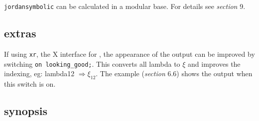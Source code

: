 {\tt jordansymbolic} can be calculated in a modular base. For details 
see {\it section} 9.

\subsection{extras}

If using {\tt xr}, the X interface for \REDUCE, the appearance of the 
output can be improved by switching {\tt on looking\_good;}. This 
converts all lambda to $\xi$ and improves the indexing, eg: lambda12 
$\Rightarrow \xi_{12}$. The example ({\it section} 6.6) shows the 
output when this switch is on.

\subsection{synopsis}

